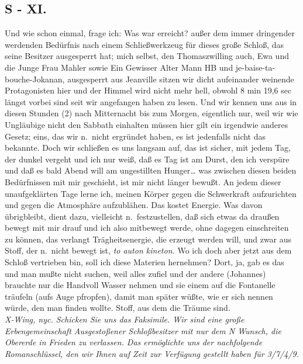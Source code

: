 \documentclass[
]{article}
\author{}
\date{\vspace{-2.5em}}
\begin{document}
\subsection{S - XI.}\label{s---xi.}

Und wie schon einmal, frage ich: Was war erreicht? außer dem immer
dringender werdenden Bedürfnis nach einem Schließwerkzeug für dieses
große Schloß, das seine Besitzer ausgesperrt hat; mich selbst, den
Thomaszwilling auch, Ewa und die Junge Frau Mahler sowie Ein Gewisser
Alter Mann HB und je-baise-ta-bouche-Jokanan, ausgesperrt aus Jeanville
sitzen wir dicht aufeinander weinende Protagonisten hier und der Himmel
wird nicht mehr hell, obwohl 8 min 19,6 sec längst vorbei sind seit wir
angefangen haben zu lesen. Und wir kennen uns aus in diesen Stunden (2)
nach Mitternacht bis zum Morgen, eigentlich nur, weil wir wie Ungläubige
nicht den Sabbath einhalten müssen hier gilt ein irgendwie anderes
Gesetz; eins, das wir n.~nicht ergründet haben, es ist jedenfalls nicht
das bekannte. Doch wir schließen es uns langsam auf, das ist sicher, mit
jedem Tag, der dunkel vergeht und ich nur weiß, daß es Tag ist am Durst,
den ich verspüre und daß es bald Abend will am ungestillten
Hunger\ldots{} was zwischen diesen beiden Bedürfnissen mit mir
geschieht, ist mir nicht länger bewußt. An jedem dieser unaufgeklärten
Tage lerne ich, meinen Körper gegen die Schwerkraft aufzurichten und
gegen die Atmosphäre aufzublähen. Das kostet Energie. Was davon
übrigbleibt, dient dazu, vielleicht n.~festzustellen, daß sich etwas da
draußen bewegt mit mir drauf und ich also mitbewegt werde, ohne dagegen
einschreiten zu können, das verlangt Trägheitsenergie, die erzeugt
werden will, und zwar aus Stoff, der n.~nicht bewegt ist, \emph{to auton
kineton. }Wo ich doch aber jetzt aus dem Schloß vertrieben bin, soll ich
diese Materien hernehmen? Dort, ja, gab es das und man mußte nicht
suchen, weil alles zufiel und der andere (Johannes) brauchte nur die
Handvoll Wasser nehmen und sie einem auf die Fontanelle träufeln (aufs
Auge pfropfen), damit man später wüßte, wie er sich nennen würde, den
man finden wollte. Stoff, aus dem die Träume sind.\\
\emph{X-Wing, nyc. Schicken Sie uns das Faksimile. Wir sind eine große
Erbengemeinschaft Ausgestoßener Schloßbesitzer mit nur dem N Wunsch, die
Obererde in Frieden zu verlassen. Das ermöglichte uns der nachfolgende
Romanschlüssel, den wir Ihnen auf Zeit zur Verfügung gestellt haben für
3/7/4/9.}
\end{document}
